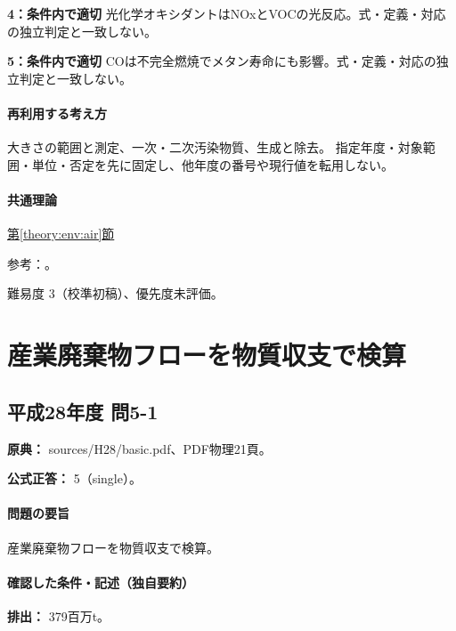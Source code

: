 \noindent\textbf{4：条件内で適切} 光化学オキシダントはNOxとVOCの光反応。式・定義・対応の独立判定と一致しない。\par

\noindent\textbf{5：条件内で適切} COは不完全燃焼でメタン寿命にも影響。式・定義・対応の独立判定と一致しない。\par

\paragraph{再利用する考え方} 大きさの範囲と測定、一次・二次汚染物質、生成と除去。 指定年度・対象範囲・単位・否定を先に固定し、他年度の番号や現行値を転用しない。

\paragraph{共通理論} \hyperref[theory:env:air]{第\ref*{theory:env:air}節}

\par 参考：\cite{env58_pmstandard,env58_pm25}。

\par 難易度 3（校準初稿）、優先度未評価。

\section{産業廃棄物フローを物質収支で検算}

\subsection{平成28年度 問5-1}
\label{q:h28-reg-basic-5-1}

\noindent\textbf{原典：} sources/H28/basic.pdf、PDF物理21頁。

\textbf{公式正答：} 5（single）。

\paragraph{問題の要旨} 産業廃棄物フローを物質収支で検算。

\paragraph{確認した条件・記述（独自要約）}\mbox{}\par

\noindent\textbf{排出：} 379百万t。\par

